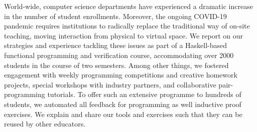 World-wide, computer science departments have experienced a dramatic increase in the number of student enrollments.
Moreover, the ongoing COVID-19 pandemic requires institutions to radically replace the traditional way of on-site teaching,
moving interaction from physical to virtual space.
We report on our strategies and experience tackling these issues
as part of a Haskell-based functional programming and verification course,
accommodating over 2000 students in the course of two semesters.
Among other things,
we fostered engagement with weekly programming competitions
and creative homework projects,
special workshops with industry partners,
and collaborative pair-programming tutorials.
To offer such an extensive programme to hundreds of students,
we automated all feedback for programming as well
inductive proof exercises.
We explain and share our tools and exercises such that they can be reused by other educators.

